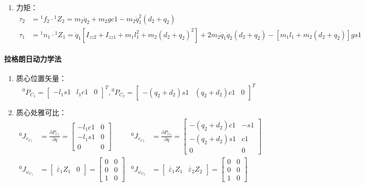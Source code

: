 \documentclass[
12pt, %
a4paper, 
oneside, %
headinclude,footinclude, %
]{scrartcl}
\begin{document}
{\begin{enumerate}
\begin{align*}
\end{align*}
\item 力矩：
\begin{align*}
\tau_2 &= {}^1 f_2 \cdot {}^1 Z_2 = m_2 \ddot{q}_2 + m_2 gc1 - m_2 \dot{q}_1^2 (d_2 + q_2) \\
\tau_1 &= {}^1 n_1 \cdot {}^1 Z_1 = \ddot{q}_1[I_{zz2} + I_{zz1} + m_1 l_1^2 + m_2(d_2 + q_2)^2] + 2m_2 \dot{q}_1 \dot{q}_2(d_2 + q_2) - [m_1 l_1 + m_2(d_2 + q_2)]gs1
\end{align*}
\end{enumerate}
\paragraph{拉格朗日动力学法}
\begin{enumerate}
\item 质心位置矢量：
$$ {}^0 P_{C_1} = \begin{bmatrix} -l_1 s1 & l_1 c1 & 0 \end{bmatrix}^T, {}^0 P_{C_2} = \begin{bmatrix} -(q_2 + d_2)s1 & (q_2 + d_2)c1 & 0 \end{bmatrix}^T $$
\item 质心处雅可比：
\begin{align*}
{}^0 J_{v_{C_1}} &= \frac{\partial P_{C_1}}{\partial q} = \begin{bmatrix} -l_1 c1 & 0 \\ -l_1 s1 & 0 \\ 0 & 0 \end{bmatrix} & {}^0 J_{v_{C_2}} &= \frac{\partial P_{C_2}}{\partial q} = \begin{bmatrix} -(q_2 + d_2)c1 & -s1 \\ -(q_2 + d_2)s1 & c1 \\ 0 & 0 \end{bmatrix} \\
{}^0 J_{\omega_{C_1}} &= \begin{bmatrix} \bar{\varepsilon}_1 Z_1 & 0 \end{bmatrix} = \begin{bmatrix} 0 & 0 \\ 0 & 0 \\ 1 & 0 \end{bmatrix} & {}^0 J_{\omega_{C_2}} &= \begin{bmatrix} \bar{\varepsilon}_1 Z_1 & \bar{\varepsilon}_2 Z_2 \end{bmatrix} = \begin{bmatrix} 0 & 0 \\ 0 & 0 \\ 1 & 0 \end{bmatrix}

\end{align*}
\end{enumerate}}
\end{document}
